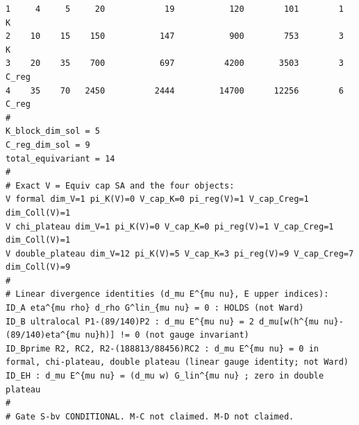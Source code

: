 \documentclass{article}
\theoremstyle{remark}
\begin{document}
\begin{lstlisting}
1     4     5     20            19           120        101        1  K
2    10    15    150           147           900        753        3  K
3    20    35    700           697          4200       3503        3  C_reg
4    35    70   2450          2444         14700      12256        6  C_reg
#
K_block_dim_sol = 5
C_reg_dim_sol = 9
total_equivariant = 14
#
# Exact V = Equiv cap SA and the four objects:
V formal dim_V=1 pi_K(V)=0 V_cap_K=0 pi_reg(V)=1 V_cap_Creg=1 dim_Coll(V)=1
V chi_plateau dim_V=1 pi_K(V)=0 V_cap_K=0 pi_reg(V)=1 V_cap_Creg=1 dim_Coll(V)=1
V double_plateau dim_V=12 pi_K(V)=5 V_cap_K=3 pi_reg(V)=9 V_cap_Creg=7 dim_Coll(V)=9
#
# Linear divergence identities (d_mu E^{mu nu}, E upper indices):
ID_A eta^{mu rho} d_rho G^lin_{mu nu} = 0 : HOLDS (not Ward)
ID_B ultralocal P1-(89/140)P2 : d_mu E^{mu nu} = 2 d_mu[w(h^{mu nu}-(89/140)eta^{mu nu}h)] != 0 (not gauge invariant)
ID_Bprime R2, RC2, R2-(188813/88456)RC2 : d_mu E^{mu nu} = 0 in formal, chi-plateau, double plateau (linear gauge identity; not Ward)
ID_EH : d_mu E^{mu nu} = (d_mu w) G_lin^{mu nu} ; zero in double plateau
#
# Gate S-bv CONDITIONAL. M-C not claimed. M-D not claimed.
\end{lstlisting}
\end{document}
